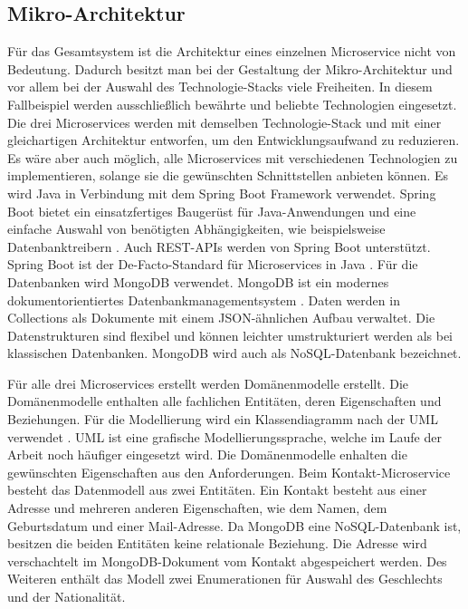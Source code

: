 \subsection{Mikro-Architektur}
Für das Gesamtsystem ist die Architektur eines einzelnen Microservice nicht von Bedeutung. Dadurch besitzt man bei der Gestaltung der Mikro-Architektur und vor allem bei der Auswahl des Technologie-Stacks viele Freiheiten. In diesem Fallbeispiel werden ausschließlich bewährte und beliebte Technologien eingesetzt. Die drei Microservices werden mit demselben Technologie-Stack und mit einer gleichartigen Architektur entworfen, um den Entwicklungsaufwand zu reduzieren. Es wäre aber auch möglich, alle Microservices mit verschiedenen Technologien zu implementieren, solange sie die gewünschten Schnittstellen anbieten können. Es wird Java in Verbindung mit dem Spring Boot Framework verwendet. Spring Boot bietet ein einsatzfertiges Baugerüst für Java-Anwendungen und eine einfache Auswahl von benötigten Abhängigkeiten, wie beispielsweise Datenbanktreibern \parencite[vgl.][]{vmwareinc.Spring2022a}. Auch REST-APIs werden von Spring Boot unterstützt. Spring Boot ist der De-Facto-Standard für Microservices in Java \parencite[vgl.][]{vmwareinc.Spring2022}. Für die Datenbanken wird MongoDB verwendet. MongoDB ist ein modernes dokumentorientiertes Datenbankmanagementsystem  \parencite[vgl.][]{mongodbinc.MongoDB2022}. Daten werden in Collections als Dokumente mit einem \ac{JSON}-ähnlichen Aufbau verwaltet. Die Datenstrukturen sind flexibel und können leichter umstrukturiert werden als bei klassischen Datenbanken. MongoDB wird auch als NoSQL-Datenbank bezeichnet.

Für alle drei Microservices erstellt werden Domänenmodelle erstellt. Die Domänenmodelle enthalten alle fachlichen Entitäten, deren Eigenschaften und Beziehungen. Für die Modellierung wird ein Klassendiagramm nach der \ac{UML} verwendet \parencite[vgl.][]{Unified2017}. \ac{UML} ist eine grafische Modellierungssprache, welche im Laufe der Arbeit noch häufiger eingesetzt wird. Die Domänenmodelle enhalten die gewünschten Eigenschaften aus den Anforderungen. Beim Kontakt-Microservice besteht das Datenmodell aus zwei Entitäten. Ein Kontakt besteht aus einer Adresse und mehreren anderen Eigenschaften, wie dem Namen, dem Geburtsdatum und einer Mail-Adresse. Da MongoDB eine NoSQL-Datenbank ist, besitzen die beiden Entitäten keine relationale Beziehung. Die Adresse wird verschachtelt im MongoDB-Dokument vom Kontakt abgespeichert werden. Des Weiteren enthält das Modell zwei Enumerationen für Auswahl des Geschlechts und der Nationalität.

